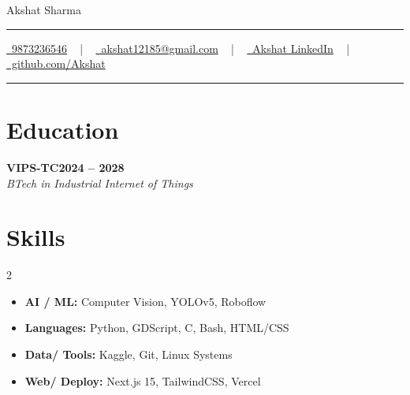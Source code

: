 \documentclass[letterpaper,10pt]{article}
\newcommand{\documentTitle}[2]{
  \begin{center}
    {\Huge\color{accentTitle} #1}
    \vspace{10pt}
    {\color{accentLine} \hrule}
    \vspace{2pt}
    \footnotesize{#2}
    \vspace{2pt}
    {\color{accentLine} \hrule}
  \end{center}
}
\newcommand{\heading}[2]{
  \hspace{10pt}#1\hfill#2\\
}
\newcommand{\headingBf}[2]{
  \heading{\textbf{#1}}{\textbf{#2}}
}
\newcommand{\headingIt}[2]{
  \heading{\textit{#1}}{\textit{#2}}
}
\begin{document}
  \documentTitle{Akshat Sharma}{
    \href{tel:9873236546}{
      \raisebox{-0.05\height} \faPhone\ 9873236546} ~ | ~
    \href{mailto:akshat12185@gmail.com}{
      \raisebox{-0.15\height} \faEnvelope\ akshat12185@gmail.com} ~ | ~
    \href{https://www.linkedin.com/in/akshat-sharma-047a8b290/}{
      \raisebox{-0.15\height} \faLinkedin\ Akshat LinkedIn} ~ | ~
    \href{https://github.com/Stormn13}{
      \raisebox{-0.15\height} \faGithub\ github.com/Akshat}
  }

  \section{Education}

  \headingBf{VIPS-TC}{2024 -- 2028}
  \headingIt{BTech in Industrial Internet of Things}{}


  \section{Skills}

  \begin{multicols}{2}
    \begin{itemize}[leftmargin=15pt, itemsep=4pt, parsep=0pt, topsep=2pt]
      \item[--] \textbf{AI / ML:} Computer Vision, YOLOv5, Roboflow
      \item[--] \textbf{Languages:} Python, GDScript, C, Bash, HTML/CSS
      \item[--] \textbf{Data/ Tools:} Kaggle, Git, Linux Systems
      \item[--] \textbf{Web/ Deploy:} Next.js 15, TailwindCSS, Vercel
    \end{itemize}
  \end{multicols}
\end{document}
